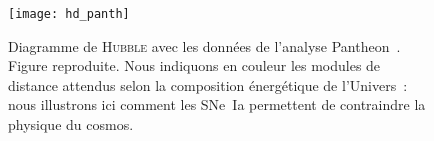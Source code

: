 \documentclass[../main/main.tex]{subfiles}
\begin{document}
\vfill
\begin{figure}[h]
    \centering
    \texttt{[image: hd\_panth]}
    \caption[Diagramme de \textsc{Hubble} avec les données de l'analyse
    Pantheon]{Diagramme de \textsc{Hubble} avec les données de l'analyse
        Pantheon~\citep{scolnic2018}. Figure reproduite. Nous indiquons en
        couleur les modules de distance attendus selon la composition
        énergétique de l'Univers~: nous illustrons ici comment les SNe~Ia
    permettent de contraindre la physique du cosmos.}\label{fig:hubdiag}
\end{figure}
\vfill

% 
% 
\end{document}
